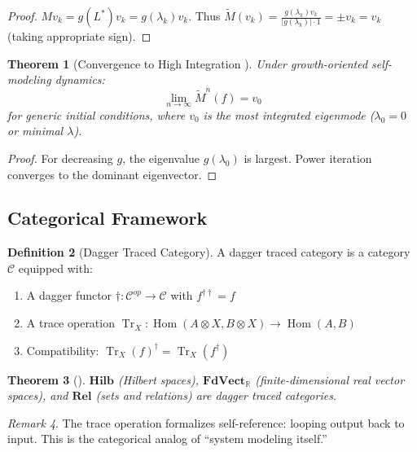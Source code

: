 \documentclass[11pt,a4paper]{article}
\theoremstyle{plain}
\newtheorem{theorem}{Theorem}[section]
\theoremstyle{definition}
\newtheorem{definition}[theorem]{Definition}
\theoremstyle{remark}
\newtheorem{remark}[theorem]{Remark}
\newcommand{\R}{\mathbb{R}}
\newcommand{\Laplacian}{L^*}
\newcommand{\Tr}{\operatorname{Tr}}
\newcommand{\Hom}{\operatorname{Hom}}
\begin{document}
\begin{proof}
$Mv_k = g(\Laplacian)v_k = g(\lambda_k) v_k$. Thus $\widetilde{M}(v_k) = \frac{g(\lambda_k) v_k}{|g(\lambda_k)| \cdot 1} = \pm v_k = v_k$ (taking appropriate sign).
\end{proof}

\begin{theorem}[Convergence to High Integration \cite{bsc2026sat}]\label{thm:convergence}
Under growth-oriented self-modeling dynamics:
\[
\lim_{n \to \infty} \widetilde{M}^n(f) = v_0
\]
for generic initial conditions, where $v_0$ is the most integrated eigenmode ($\lambda_0 = 0$ or minimal $\lambda$).
\end{theorem}

\begin{proof}
For decreasing $g$, the eigenvalue $g(\lambda_0)$ is largest. Power iteration converges to the dominant eigenvector.
\end{proof}

\subsection{Categorical Framework}

\begin{definition}[Dagger Traced Category]\label{def:dagger}
A dagger traced category is a category $\mathcal{C}$ equipped with:
\begin{enumerate}[label=(\roman*),noitemsep]
    \item A dagger functor $\dagger : \mathcal{C}^{op} \to \mathcal{C}$ with $f^{\dagger\dagger} = f$
    \item A trace operation $\Tr_X : \Hom(A \otimes X, B \otimes X) \to \Hom(A, B)$
    \item Compatibility: $\Tr_X(f)^\dagger = \Tr_X(f^\dagger)$
\end{enumerate}
\end{definition}

\begin{theorem}[\cite{bsc2026eb}]\label{thm:categorical}
$\mathbf{Hilb}$ (Hilbert spaces), $\mathbf{FdVect}_\R$ (finite-dimensional real vector spaces), and $\mathbf{Rel}$ (sets and relations) are dagger traced categories.
\end{theorem}

\begin{remark}
The trace operation formalizes self-reference: looping output back to input. This is the categorical analog of ``system modeling itself.''
\end{remark}
\end{document}
